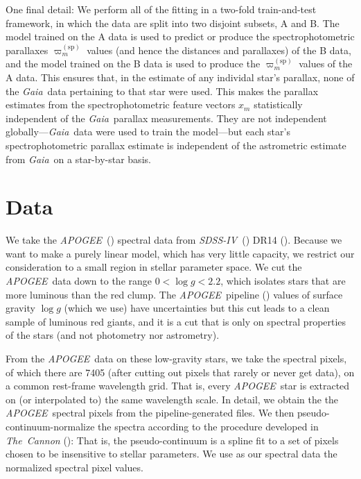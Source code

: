\documentclass[modern]{aastex62}
\newcommand{\code}[1]{\texttt{\detokenize{#1}}}
\newcommand{\acronym}[1]{{\small{#1}}}
\newcommand{\project}[1]{\textsl{#1}}
\newcommand{\apogee}{\project{\acronym{APOGEE}}}
\newcommand{\gaia}{\project{Gaia}}
\newcommand{\sdssiv}{\project{\acronym{SDSS-IV}}}
\newcommand{\logg}{\log g}
\newcommand{\sparallax}{\varpi^{(\mathrm{sp})}}
\begin{document}
One final detail: We perform all of the fitting in a two-fold train-and-test framework,
in which the data are split into two disjoint subsets, A and B.
The model trained on the A data is used to predict or produce
the spectrophotometric parallaxes $\sparallax_m$ values (and hence
the distances and parallaxes) of the B data,
and the model trained on the B data is used to 
produce the $\sparallax_m$ values of the A data.
This ensures that, in the estimate of any individal star's
parallax, none of the \gaia\ data pertaining to that star were used.
This makes the parallax estimates from the spectrophotometric feature vectors
$x_m$ statistically independent of the \gaia\ parallax measurements.
They are not independent globally---\gaia\ data were used to train the model---but
each star's spectrophotometric parallax estimate is independent
of the astrometric estimate from \gaia\ on a star-by-star basis.

\section{Data}

We take the \apogee\ (\citealt{aapogee, wapogee, apogee}) spectral data
from \sdssiv\ (\citealt{sdssiv}) \acronym{DR14} (\citealt{dr14}).
Because we want to make a purely linear model, which has very little capacity,
we restrict our consideration to a small region in stellar parameter space.
We cut the \apogee\ data down to the range $0<\logg<2.2$, which isolates
stars that are more luminous than the red clump.
The \apogee\ pipeline (\citealt{aspcap})
values of surface gravity $\logg$ (which we use) have uncertainties but
this cut leads to a clean sample of luminous red giants, and it is a cut
that is only on spectral properties of the stars (and not photometry nor astrometry).

From the \apogee\ data on these low-gravity stars, we take the spectral pixels,
of which there are 7405 (after cutting out pixels that rarely or never get data),
on a common rest-frame wavelength grid.
That is, every \apogee\ star is extracted on (or interpolated to)
the same wavelength scale.
In detail, we obtain the
the \apogee\ spectral pixels from the pipeline-generated \code{aspcapStar} files.
We then pseudo-continuum-normalize the spectra according to the procedure developed
in \project{The~Cannon} (\citealt{cannon}):
That is, the pseudo-continuum is a spline fit to a set
of pixels chosen to be insensitive to stellar parameters.
We use as our spectral data the normalized spectral pixel values.
\end{document}
